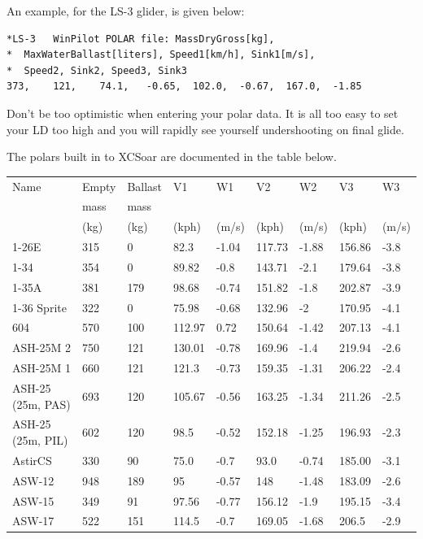 \documentclass[a4paper,12pt]{refrep}
\begin{document}
An example, for the LS-3 glider, is given below:
\begin{verbatim}
*LS-3	WinPilot POLAR file: MassDryGross[kg], 
*  MaxWaterBallast[liters], Speed1[km/h], Sink1[m/s], 
*  Speed2, Sink2, Speed3, Sink3  	
373,	121,	74.1,	-0.65,	102.0,	-0.67,	167.0,	-1.85
\end{verbatim}

\tip Don't be too optimistic when entering your polar data. It is all too
easy to set your LD too high and you will rapidly see yourself
undershooting on final glide.

The polars built in to XCSoar are documented in the table below.

\begin{maxipage}
\begin{small}
\begin{longtable}{l l l l l l l l l}
\toprule
Name & Empty & Ballast & V1 & W1 & V2 & W2 & V3 & W3 \\
     & mass       & mass         &  &  &  &  &  &  \\
     & (kg)       & (kg)         & (kph) & (m/s) & (kph) & (m/s) & (kph) & (m/s) \\
\midrule
1-26E & 315 & 0 & 82.3 & -1.04 & 117.73 & -1.88 & 156.86 & -3.8 \\
1-34 & 354 & 0 & 89.82 & -0.8 & 143.71 & -2.1 & 179.64 & -3.8 \\
1-35A & 381 & 179 & 98.68 & -0.74 & 151.82 & -1.8 & 202.87 & -3.9 \\
1-36 Sprite & 322 & 0 & 75.98 & -0.68 & 132.96 & -2 & 170.95 & -4.1 \\
604 & 570 & 100 & 112.97 & 0.72 & 150.64 & -1.42 & 207.13 & -4.1 \\
ASH-25M 2 & 750 & 121 & 130.01 & -0.78 & 169.96 & -1.4 & 219.94 & -2.6 \\
ASH-25M 1 & 660 & 121 & 121.3 & -0.73 & 159.35 & -1.31 & 206.22 & -2.4 \\
ASH-25 (25m, PAS) & 693 & 120 & 105.67 & -0.56 & 163.25 & -1.34 & 211.26 & -2.5 \\
ASH-25 (25m, PIL) & 602 & 120 & 98.5 & -0.52 & 152.18 & -1.25 & 196.93 & -2.3 \\
AstirCS & 330 & 90 & 75.0 & -0.7 & 93.0 & -0.74 & 185.00 & -3.1 \\
ASW-12 & 948 & 189 & 95 & -0.57 & 148 & -1.48 & 183.09 & -2.6 \\
ASW-15 & 349 & 91 & 97.56 & -0.77 & 156.12 & -1.9 & 195.15 & -3.4 \\
ASW-17 & 522 & 151 & 114.5 & -0.7 & 169.05 & -1.68 & 206.5 & -2.9 \\

\end{longtable}
\end{small}
\end{maxipage}
\end{document}
